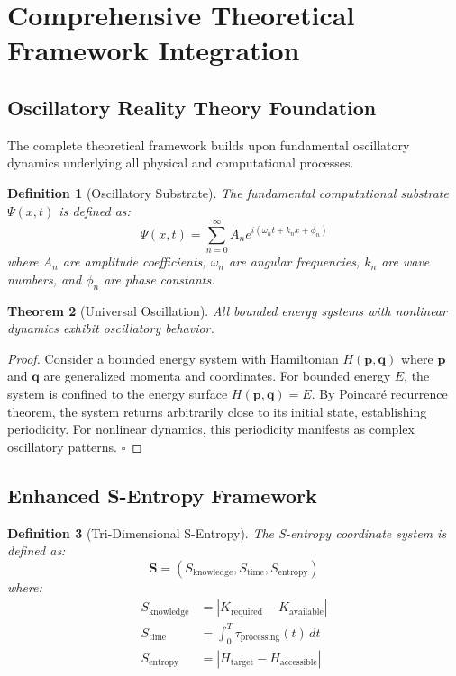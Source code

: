 \documentclass[12pt,a4paper]{article}
\newtheorem{theorem}{Theorem}[section]
\newtheorem{definition}[theorem]{Definition}
\begin{document}
\section{Comprehensive Theoretical Framework Integration}

\subsection{Oscillatory Reality Theory Foundation}

The complete theoretical framework builds upon fundamental oscillatory dynamics underlying all physical and computational processes.

\begin{definition}[Oscillatory Substrate]
The fundamental computational substrate $\Psi(x,t)$ is defined as:
\begin{equation}
\Psi(x,t) = \sum_{n=0}^{\infty} A_n e^{i(\omega_n t + k_n x + \phi_n)}
\end{equation}
where $A_n$ are amplitude coefficients, $\omega_n$ are angular frequencies, $k_n$ are wave numbers, and $\phi_n$ are phase constants.
\end{definition}

\begin{theorem}[Universal Oscillation]
All bounded energy systems with nonlinear dynamics exhibit oscillatory behavior.
\end{theorem}

\begin{proof}
Consider a bounded energy system with Hamiltonian $H(\mathbf{p}, \mathbf{q})$ where $\mathbf{p}$ and $\mathbf{q}$ are generalized momenta and coordinates. For bounded energy $E$, the system is confined to the energy surface $H(\mathbf{p}, \mathbf{q}) = E$. By Poincaré recurrence theorem, the system returns arbitrarily close to its initial state, establishing periodicity. For nonlinear dynamics, this periodicity manifests as complex oscillatory patterns. $\square$
\end{proof}

\subsection{Enhanced S-Entropy Framework}

\begin{definition}[Tri-Dimensional S-Entropy]
The S-entropy coordinate system is defined as:
\begin{equation}
\mathbf{S} = (S_{\text{knowledge}}, S_{\text{time}}, S_{\text{entropy}})
\end{equation}
where:
\begin{align}
S_{\text{knowledge}} &= |K_{\text{required}} - K_{\text{available}}| \\
S_{\text{time}} &= \int_0^{T} \tau_{\text{processing}}(t) \, dt \\
S_{\text{entropy}} &= |H_{\text{target}} - H_{\text{accessible}}|
\end{align}
\end{definition}
\end{document}
